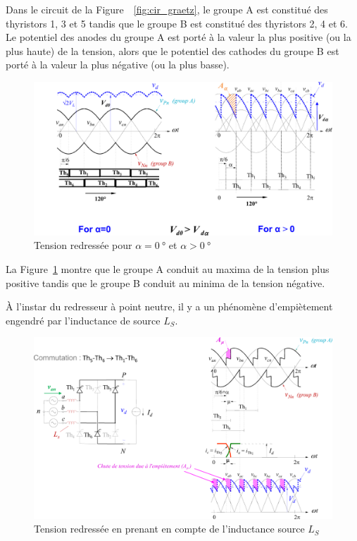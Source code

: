 \documentclass[a4paper, 11pt, openany, oneside, french]{article}
\begin{document}
Dans le circuit de la Figure~~\ref{fig:cir_graetz}, le groupe A est constitué des thyristors 1, 3 et 5 tandis que le groupe B est constitué des thyristors 2, 4 et 6. Le potentiel des anodes du groupe A est porté à la valeur la plus positive (ou la plus haute) de la tension, alors que le potentiel des cathodes du groupe B est porté à la valeur la plus négative (ou la plus basse).

\begin{figure}[!ht]
    \centering
    \includegraphics[width=0.8\linewidth]{graetz_wave}
    \caption{Tension redressée pour $\alpha = \SI{0}{\degree}$ et  $\alpha > \SI{0}{\degree}$}
    \label{fig:wave_graetz}
\end{figure}

La Figure~\ref{fig:wave_graetz} montre que le groupe A conduit au maxima de la tension plus positive tandis que le groupe B conduit au minima de la tension négative.

À l'instar du redresseur à point neutre, il y a un phénomène d'empiètement engendré par l'inductance de source $L_S$.

\begin{figure}[!ht]
    \centering
    \includegraphics[width=0.8\linewidth]{graetz_empiet}
    \caption{Tension redressée en prenant en compte de l'inductance source $L_S$}
    \label{fig:empiet_graetz}
\end{figure}
\end{document}
